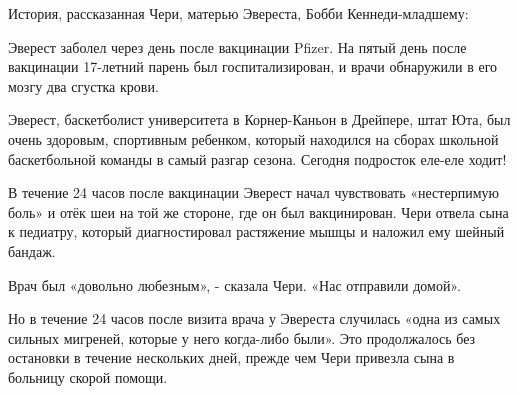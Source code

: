 История, рассказанная Чери, матерью Эвереста, Бобби Кеннеди-младшему:

Эверест заболел через день после вакцинации Pfizer. На пятый день после
вакцинации 17-летний парень был госпитализирован, и врачи обнаружили в его мозгу
два сгустка крови.

Эверест, баскетболист университета в Корнер-Каньон в Дрейпере, штат Юта, был
очень здоровым, спортивным ребенком, который находился на сборах школьной
баскетбольной команды в самый разгар сезона. Сегодня подросток еле-еле ходит!

В течение 24 часов после вакцинации Эверест начал чувствовать «нестерпимую боль»
и отёк шеи на той же стороне, где он был вакцинирован. Чери отвела сына к
педиатру, который диагностировал растяжение мышцы и наложил ему шейный бандаж.

Врач был «довольно любезным», - сказала Чери. «Нас отправили домой».

Но в течение 24 часов после визита врача у Эвереста случилась «одна из самых
сильных мигреней, которые у него когда-либо были». Это продолжалось без
остановки в течение нескольких дней, прежде чем Чери привезла сына в больницу
скорой помощи.
